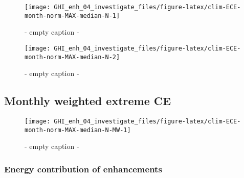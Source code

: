 \documentclass[
  10pt,
  a4paper,oneside]{article}
\begin{document}
\begin{figure}[H]

{\centering \texttt{[image: GHI\_enh\_04\_investigate\_files/figure-latex/clim-ECE-month-norm-MAX-median-N-1]} 

}

\caption{ - empty caption - }\label{fig:clim-ECE-month-norm-MAX-median-N-1}
\end{figure}
\begin{figure}[H]

{\centering \texttt{[image: GHI\_enh\_04\_investigate\_files/figure-latex/clim-ECE-month-norm-MAX-median-N-2]} 

}

\caption{ - empty caption - }\label{fig:clim-ECE-month-norm-MAX-median-N-2}
\end{figure}

\hypertarget{monthly-weighted-extreme-ce}{%
\subsection{Monthly weighted extreme CE}\label{monthly-weighted-extreme-ce}}

\begin{figure}[H]

{\centering \texttt{[image: GHI\_enh\_04\_investigate\_files/figure-latex/clim-ECE-month-norm-MAX-median-N-MW-1]} 

}

\caption{ - empty caption - }\label{fig:clim-ECE-month-norm-MAX-median-N-MW}
\end{figure}

\newpage
\FloatBarrier

\hypertarget{energy-contribution-of-enhancements}{%
\subsubsection{Energy contribution of enhancements}\label{energy-contribution-of-enhancements}}
\end{document}
